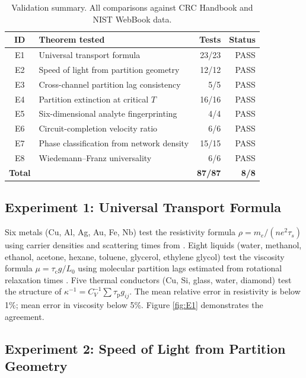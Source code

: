 \documentclass[twocolumn,10pt,a4paper]{article}
\theoremstyle{definition}
\theoremstyle{remark}
\newcommand{\tauP}{\tau_{\mathrm{p}}}
\newcommand{\tauC}{\tau_{\mathrm{c}}}
\begin{document}
\begin{table}[H]
\centering
\caption{Validation summary. All comparisons against CRC Handbook \citep{haynes2016,lide2010} and NIST WebBook \citep{nist_webbook} data.}
\label{tab:validation_summary}
\small
\begin{tabular}{clrr}
\toprule
\textbf{ID} & \textbf{Theorem tested} & \textbf{Tests} & \textbf{Status} \\
\midrule
E1 & Universal transport formula & 23/23 & PASS \\
E2 & Speed of light from partition geometry & 12/12 & PASS \\
E3 & Cross-channel partition lag consistency & 5/5 & PASS \\
E4 & Partition extinction at critical $T$ & 16/16 & PASS \\
E5 & Six-dimensional analyte fingerprinting & 4/4 & PASS \\
E6 & Circuit-completion velocity ratio & 6/6 & PASS \\
E7 & Phase classification from network density & 15/15 & PASS \\
E8 & Wiedemann--Franz universality & 6/6 & PASS \\
\midrule
\textbf{Total} & & \textbf{87/87} & \textbf{8/8} \\
\bottomrule
\end{tabular}
\end{table}

\subsection{Experiment 1: Universal Transport Formula}
\label{sec:val_E1}

Six metals (Cu, Al, Ag, Au, Fe, Nb) test the resistivity formula $\rho = m_e/(ne^2\tau_s)$ using carrier densities and scattering times from \citep{ashcroft1976,haynes2016}. Eight liquids (water, methanol, ethanol, acetone, hexane, toluene, glycerol, ethylene glycol) test the viscosity formula $\mu = \tauC g/L_0$ using molecular partition lags estimated from rotational relaxation times \citep{atkins2018}. Five thermal conductors (Cu, Si, glass, water, diamond) test the structure of $\kappa^{-1} = C_V^{-1}\sum\tauP g_{ij}$. The mean relative error in resistivity is below 1\%; mean error in viscosity below 5\%. Figure \ref{fig:E1} demonstrates the agreement.

\subsection{Experiment 2: Speed of Light from Partition Geometry}
\label{sec:val_E2}
\end{document}
